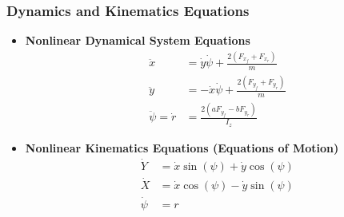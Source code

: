 \documentclass{beamer}
\begin{document}
\begin{frame}
	
	\frametitle{Dynamics and Kinematics Equations}
	\begin{itemize}
		\item \textbf{Nonlinear Dynamical System Equations} 
		\begin{subequations} 
			\label{eqn:longitudinal_lateral_yaw_second_derivative}
			\begin{align} \ddot{x} &= \dot{y}\dot{\psi} + \frac{2(F_{x_{f}}+F_{x_{r}})}{m} \label{eqn:longitudinal_second_derivative} \\ 
			\ddot{y} &= -\dot{x}\dot{\psi} + \frac{2(F_{y_{f}}+F_{y_{r}})}{m} \label{eqn:lateral_second_derivative} \\ 
			\ddot{\psi}=\dot{r} &= \frac{2(aF_{y_{f}}-bF_{y_{r}})}{I_z} \label{eqn:yaw_second_derivative}
			\end{align} 
		\end{subequations}
		\vspace{-2mm}
		\item \textbf{Nonlinear Kinematics Equations (Equations of Motion)} 
		\begin{subequations} 
			\begin{align} \dot{Y} &= \dot{x}\sin(\psi) + \dot{y}\cos(\psi)  \label{eqn:y_inertial_frame} \\ 
			\dot{X} &= \dot{x}\cos(\psi) - \dot{y}\sin(\psi) \label{eqn:x_inertial_frame} \\
			\dot{\psi} &= r
			\end{align} 
		\end{subequations}
	\end{itemize}
	
\end{frame}
\end{document}
